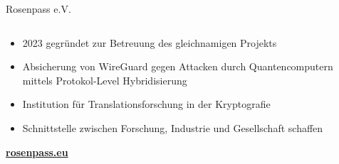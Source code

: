 \begin{frame}{Rosenpass e.V.}
  \begin{columns}[fullwidth,c]

    \begin{column}{.7\linewidth}
      \begin{itemize}
        \item 2023 gegründet zur Betreuung des gleichnamigen Projekts
        \vfill
        \item Absicherung von WireGuard gegen Attacken durch Quantencomputern mittels Protokol-Level Hybridisierung
        \item Institution für Translationsforschung in der Kryptografie
        \vfill
        \item Schnittstelle zwischen Forschung, Industrie und Gesellschaft schaffen
      \end{itemize}
      \bigskip
      \textbf{\url{rosenpass.eu}}
    \end{column}%
  \end{columns}
\end{frame}
